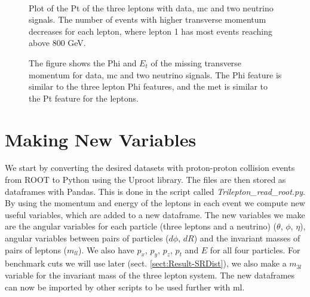 \documentclass[a4paper, american, 12pt]{report}
\begin{document}
	\begin{figure}[htb!]
		\\
		\hspace*{3.cm}
		\caption[Pt plots for the three leptons.]{Plot of the Pt of the three leptons with data, \acrshort{mc} and two neutrino signals. The number of events with higher transverse momentum decreases for each lepton, where lepton 1 has most events reaching above 800 GeV. \label{fig:Pt_orig}}
	\end{figure}

	\begin{figure}[htb!]
		\caption[Phi and missing transverse momentum plots for the neutrino.]{The figure shows the Phi and $E_t$ of the missing transverse momentum for data, \acrshort{mc} and two neutrino signals. The Phi feature is similar to the three lepton Phi features, and the \acrshort{met} is similar to the Pt feature for the leptons. \label{fig:MET_orig}}
	\end{figure}


	\section{Making New Variables}
	\label{sect:Method-MakingVariables}
	We start by converting the desired datasets with proton-proton collision events from ROOT to Python using the Uproot library. The files are then stored as dataframes with Pandas. This is done in the script called \textit{Trilepton\_read\_root.py}. By using the momentum and energy of the leptons in each event we compute new useful variables, which are added to a new dataframe. The new variables we make are the angular variables for each particle (three leptons and a neutrino) ($\theta$, $\phi$, $\eta$), angular variables between pairs of particles ($d\phi$, $dR$) and the invariant masses of pairs of leptons ($m_{ll}$). We also have $p_x$, $p_y$, $p_z$, $p_t$ and $E$ for all four particles. For benchmark cuts we will use later (sect. \ref{sect:Result-SRDist}), we also make a $m_{3l}$ variable for the invariant mass of the three lepton system. The new dataframes can now be imported by other scripts to be used further with \acrshort{ml}. 
	
\end{document}
